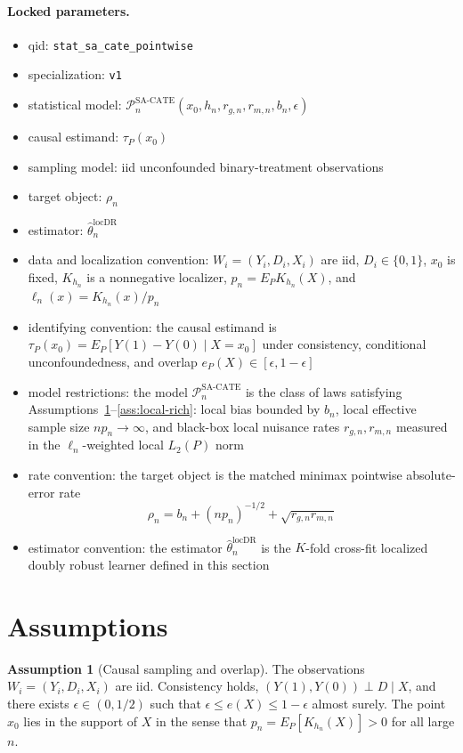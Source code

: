 \documentclass[11pt]{article}
\theoremstyle{definition}
\newtheorem{assumption}{Assumption}
\theoremstyle{plain}
\theoremstyle{remark}
\begin{document}
\paragraph{Locked parameters.}
\begin{itemize}[leftmargin=*]
  \item qid: \texttt{stat\_sa\_cate\_pointwise}
  \item specialization: \texttt{v1}
  \item statistical model: $\mathcal{P}_n^{\mathrm{SA\text{-}CATE}}(x_0,h_n,r_{g,n},r_{m,n},b_n,\epsilon)$
  \item causal estimand: $\tau_P(x_0)$
  \item sampling model: iid unconfounded binary-treatment observations
  \item target object: $\rho_n$
  \item estimator: $\hat\theta_n^{\mathrm{locDR}}$
  \item data and localization convention: $W_i=(Y_i,D_i,X_i)$ are iid, $D_i\in\{0,1\}$, $x_0$ is fixed, $K_{h_n}$ is a nonnegative localizer, $p_n=E_P K_{h_n}(X)$, and $\ell_n(x)=K_{h_n}(x)/p_n$
  \item identifying convention: the causal estimand is $\tau_P(x_0)=E_P[Y(1)-Y(0)\mid X=x_0]$ under consistency, conditional unconfoundedness, and overlap $e_P(X)\in[\epsilon,1-\epsilon]$
  \item model restrictions: the model $\mathcal{P}_n^{\mathrm{SA\text{-}CATE}}$ is the class of laws satisfying Assumptions~\ref{ass:causal}--\ref{ass:local-rich}: local bias bounded by $b_n$, local effective sample size $n p_n\to\infty$, and black-box local nuisance rates $r_{g,n},r_{m,n}$ measured in the $\ell_n$-weighted local $L_2(P)$ norm
  \item rate convention: the target object is the matched minimax pointwise absolute-error rate
  \[
    \rho_n=b_n+(n p_n)^{-1/2}+\sqrt{r_{g,n}r_{m,n}}
  \]
  \item estimator convention: the estimator $\hat\theta_n^{\mathrm{locDR}}$ is the $K$-fold cross-fit localized doubly robust learner defined in this section
\end{itemize}

\section{Assumptions}
\begin{assumption}[Causal sampling and overlap]\label{ass:causal}
The observations $W_i=(Y_i,D_i,X_i)$ are iid. Consistency holds, $(Y(1),Y(0))\perp D\mid X$, and
there exists $\epsilon\in(0,1/2)$ such that $\epsilon\le e(X)\le 1-\epsilon$ almost surely. The
point $x_0$ lies in the support of $X$ in the sense that $p_n=E_P[K_{h_n}(X)]>0$ for all large $n$.
\end{assumption}
\end{document}
